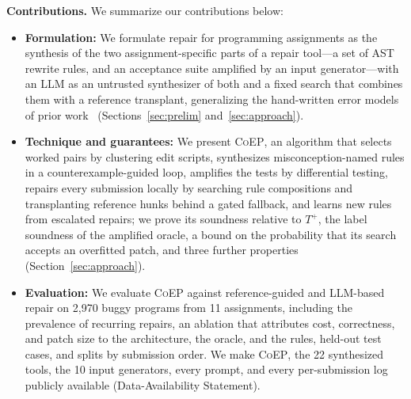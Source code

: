 \documentclass[acmsmall,screen,review,anonymous,nonacm]{acmart}
\newcommand{\tool}{\textsc{CoEP}\xspace}
\begin{document}
\textbf{Contributions.} We summarize our contributions below:
\begin{itemize}
  \item \textbf{Formulation:} We formulate repair for programming assignments as the synthesis of the two assignment-specific parts of a repair tool---a set of AST rewrite rules, and an acceptance suite amplified by an input generator---with an LLM as an untrusted synthesizer of both and a fixed search that combines them with a reference transplant, generalizing the hand-written error models of prior work~\cite{singh2013automated} (Sections~\ref{sec:prelim} and~\ref{sec:approach}).
  \item \textbf{Technique and guarantees:} We present \tool, an algorithm that selects worked pairs by clustering edit scripts, synthesizes misconception-named rules in a counterexample-guided loop, amplifies the tests by differential testing, repairs every submission locally by searching rule compositions and transplanting reference hunks behind a gated fallback, and learns new rules from escalated repairs; we prove its soundness relative to $T^{+}$, the label soundness of the amplified oracle, a bound on the probability that its search accepts an overfitted patch, and three further properties (Section~\ref{sec:approach}).
  \item \textbf{Evaluation:} We evaluate \tool against reference-guided and LLM-based repair on 2{,}970 buggy programs from 11 assignments, including the prevalence of recurring repairs, an ablation that attributes cost, correctness, and patch size to the architecture, the oracle, and the rules, held-out test cases, and splits by submission order. We make \tool, the 22 synthesized tools, the 10 input generators, every prompt, and every per-submission log publicly available (Data-Availability Statement).
\end{itemize}
\end{document}

